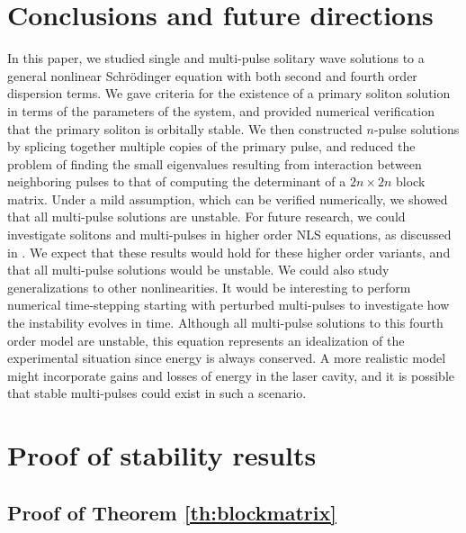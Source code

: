 \documentclass[12pt]{elsarticle}
\begin{document}
\section{Conclusions and future directions}

In this paper, we studied single and multi-pulse solitary wave solutions to a general nonlinear Schr{\"o}dinger equation with both second and fourth order dispersion terms. We gave criteria for the existence of a primary soliton solution in terms of the parameters of the system, and provided numerical verification that the primary soliton is orbitally stable. We then constructed $n$-pulse solutions by splicing together multiple copies of the primary pulse, and reduced the problem of finding the small eigenvalues resulting from interaction between neighboring pulses to that of computing the determinant of a $2n\times2n$ block matrix. Under a mild assumption, which can be verified numerically, we showed that all multi-pulse solutions are unstable. For future research, we could investigate solitons and multi-pulses in higher order NLS equations, as discussed in \cite{Runge2020}. We expect that these results would hold for these higher order variants, and that all multi-pulse solutions would be unstable. We could also study generalizations to other nonlinearities. It would be interesting to perform numerical time-stepping starting with perturbed multi-pulses to investigate how the instability evolves in time. Although all multi-pulse solutions to this fourth order model are unstable, this equation represents an idealization of the experimental situation since energy is always conserved. A more realistic model might incorporate gains and losses of energy in the laser cavity, and it is possible that stable multi-pulses could exist in such a scenario.

\section{Proof of stability results}\label{sec:proofs}

\subsection{Proof of Theorem \ref{th:blockmatrix}}\label{sec:blockmatrixproof}
\end{document}
